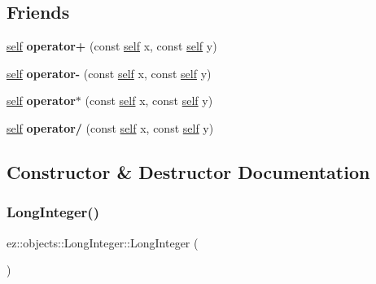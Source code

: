 \subsection*{Friends}
\begin{DoxyCompactItemize}
\item 
\mbox{\label{classez_1_1objects_1_1LongInteger_ac219ecb06730e7707b9bb78b5da63c3b}} 
\hyperlink{classez_1_1objects_1_1LongInteger}{self} {\bfseries operator+} (const \hyperlink{classez_1_1objects_1_1LongInteger}{self} x, const \hyperlink{classez_1_1objects_1_1LongInteger}{self} y)
\item 
\mbox{\label{classez_1_1objects_1_1LongInteger_a6750cba02a1d652b1bd892bfba555e50}} 
\hyperlink{classez_1_1objects_1_1LongInteger}{self} {\bfseries operator-\/} (const \hyperlink{classez_1_1objects_1_1LongInteger}{self} x, const \hyperlink{classez_1_1objects_1_1LongInteger}{self} y)
\item 
\mbox{\label{classez_1_1objects_1_1LongInteger_a4f9af882c7a074ed8e1f8da41bd31dc9}} 
\hyperlink{classez_1_1objects_1_1LongInteger}{self} {\bfseries operator$\ast$} (const \hyperlink{classez_1_1objects_1_1LongInteger}{self} x, const \hyperlink{classez_1_1objects_1_1LongInteger}{self} y)
\item 
\mbox{\label{classez_1_1objects_1_1LongInteger_aa69c5e8b6898bb99a6f4d6e8962560c8}} 
\hyperlink{classez_1_1objects_1_1LongInteger}{self} {\bfseries operator/} (const \hyperlink{classez_1_1objects_1_1LongInteger}{self} x, const \hyperlink{classez_1_1objects_1_1LongInteger}{self} y)
\end{DoxyCompactItemize}


\subsection{Constructor \& Destructor Documentation}
\mbox{\label{classez_1_1objects_1_1LongInteger_aabc00d94ae5a2af535316cf674c83965}} 
\subsubsection{\texorpdfstring{Long\+Integer()}{LongInteger()}\hspace{0.1cm}{\footnotesize\ttfamily [1/3]}}
{\footnotesize\ttfamily ez\+::objects\+::\+Long\+Integer\+::\+Long\+Integer (\begin{DoxyParamCaption}{ }\end{DoxyParamCaption})\hspace{0.3cm}{\ttfamily [inline]}}

